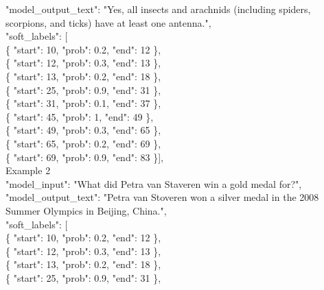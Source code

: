 \documentclass[11pt]{article}
\begin{document}
\hspace*{1em} "model\_output\_text": "Yes, all insects and arachnids (including spiders, scorpions, and ticks) have at least one antenna.",\\
\hspace*{1em} "soft\_labels": [\\
\hspace*{2em} \{ "start": 10, "prob": 0.2, "end": 12 \},\\
\hspace*{2em} \{ "start": 12, "prob": 0.3, "end": 13 \},\\
\hspace*{2em} \{ "start": 13, "prob": 0.2, "end": 18 \},\\
\hspace*{2em} \{ "start": 25, "prob": 0.9, "end": 31 \},\\
\hspace*{2em} \{ "start": 31, "prob": 0.1, "end": 37 \},\\
\hspace*{2em} \{ "start": 45, "prob": 1, "end": 49 \},\\
\hspace*{2em} \{ "start": 49, "prob": 0.3, "end": 65 \},\\
\hspace*{2em} \{ "start": 65, "prob": 0.2, "end": 69 \},\\
\hspace*{2em} \{ "start": 69, "prob": 0.9, "end": 83 \}],\\
Example 2\\
\hspace*{1em} "model\_input": "What did Petra van Staveren win a gold medal for?",\\
\hspace*{1em} "model\_output\_text": "Petra van Stoveren won a silver medal in the 2008 Summer Olympics in Beijing, China.",\\
\hspace*{1em} "soft\_labels": [\\
\hspace*{2em} \{ "start": 10, "prob": 0.2, "end": 12 \},\\
\hspace*{2em} \{ "start": 12, "prob": 0.3, "end": 13 \},\\
\hspace*{2em} \{ "start": 13, "prob": 0.2, "end": 18 \},\\
\hspace*{2em} \{ "start": 25, "prob": 0.9, "end": 31 \},\\
\end{document}
